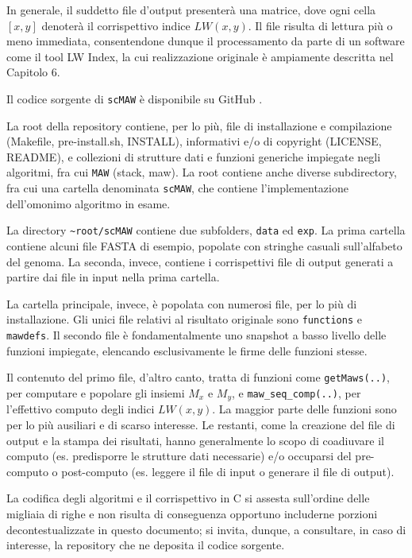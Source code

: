 \vspace{3mm}

In generale, il suddetto file d'output presenterà una matrice, dove ogni cella $[x,y]$ denoterà il corrispettivo indice $LW(x,y)$. Il file risulta di lettura più o meno immediata, consentendone dunque il processamento da parte di un software come il tool LW Index, la cui realizzazione originale è ampiamente descritta nel Capitolo 6.

\vspace{3mm}

Il codice sorgente di \verb|scMAW| è disponibile su GitHub \cite{mawGit}.

\vspace{3mm}

La root della repository contiene, per lo più, file di installazione e compilazione (Makefile, pre-install.sh, INSTALL), informativi e/o di copyright (LICENSE, README), e collezioni di strutture dati e funzioni generiche impiegate negli algoritmi, fra cui \verb|MAW| (stack, maw). La root contiene anche diverse subdirectory, fra cui una cartella denominata \verb|scMAW|, che contiene l'implementazione dell'omonimo algoritmo in esame.

\vspace{3mm}

La directory \verb|~root/scMAW| contiene due subfolders, \verb|data| ed \verb|exp|. La prima cartella contiene alcuni file FASTA di esempio, popolate con stringhe casuali sull'alfabeto del genoma. La seconda, invece, contiene i corrispettivi file di output generati a partire dai file in input nella prima cartella.

La cartella principale, invece, è popolata con numerosi file, per lo più di installazione.  Gli unici file relativi al risultato originale sono \verb|functions| e \verb|mawdefs|. Il secondo file è fondamentalmente uno snapshot a basso livello delle funzioni impiegate, elencando esclusivamente le firme delle funzioni stesse.

Il contenuto del primo file, d'altro canto, tratta di funzioni come \verb|getMaws(..)|, per computare e popolare gli insiemi $M_x$ e $M_y$, e \verb|maw_seq_comp(..)|, per l'effettivo computo degli indici $LW(x,y)$. La maggior parte delle funzioni sono per lo più ausiliari e di scarso interesse. Le restanti, come la creazione del file di output e la stampa dei risultati, hanno generalmente lo scopo di coadiuvare il computo (es. predisporre le strutture dati necessarie) e/o occuparsi del pre-computo o post-computo (es. leggere il file di input o generare il file di output).

\vspace{3mm}

La codifica degli algoritmi e il corrispettivo in C si assesta sull'ordine delle migliaia di righe e non risulta di conseguenza opportuno includerne porzioni decontestualizzate in questo documento; si invita, dunque, a consultare, in caso di interesse, la repository che ne deposita il codice sorgente.